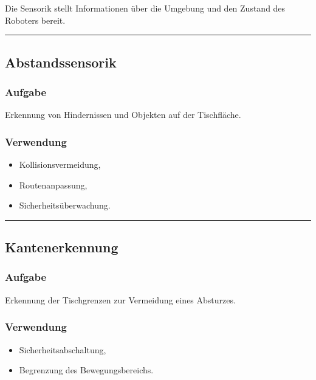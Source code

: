 \documentclass[
  a4paper,
  12pt,
  DIV=12,        %
  parskip=half,  %
  headings=small %
]{scrartcl}
\theoremstyle{definition}
\providecommand{\tightlist}{%
  \setlength{\itemsep}{0pt}\setlength{\parskip}{0pt}}
\theoremstyle{definition}
\providecommand{\tightlist}{%
  \setlength{\itemsep}{0pt}\setlength{\parskip}{0pt}}
\begin{document}
Die Sensorik stellt Informationen über die Umgebung und den Zustand des
Roboters bereit.

\begin{center}\rule{0.5\linewidth}{0.5pt}\end{center}

\subsection{Abstandssensorik}\label{abstandssensorik}

\subsubsection{Aufgabe}\label{aufgabe-3}

Erkennung von Hindernissen und Objekten auf der Tischfläche.

\subsubsection{Verwendung}\label{verwendung}

\begin{itemize}
\tightlist
\item
  Kollisionsvermeidung,
\item
  Routenanpassung,
\item
  Sicherheitsüberwachung.
\end{itemize}

\begin{center}\rule{0.5\linewidth}{0.5pt}\end{center}

\subsection{Kantenerkennung}\label{kantenerkennung}

\subsubsection{Aufgabe}\label{aufgabe-4}

Erkennung der Tischgrenzen zur Vermeidung eines Absturzes.

\subsubsection{Verwendung}\label{verwendung-1}

\begin{itemize}
\tightlist
\item
  Sicherheitsabschaltung,
\item
  Begrenzung des Bewegungsbereichs.
\end{itemize}
\end{document}
